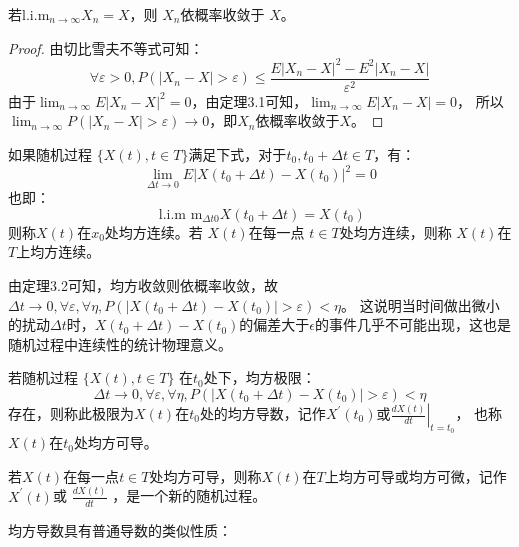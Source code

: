 \begin{theorem}
  若$\mathrm{l.i.m}_{n \rightarrow \infty} X_n=X$，则 $X_n$依概率收敛于 $X$。
\end{theorem}

\begin{proof}
  由切比雪夫不等式可知：
  $$
  \forall \varepsilon>0, P\left(\left|X_n-X\right|>\varepsilon\right) \leq \frac{E\left|X_n-X\right|^2-E^2\left|X_n-X\right|}{\varepsilon^2}
  $$
  由于$\lim _{n \rightarrow \infty} E\left|X_n-X\right|^2=0$，由定理3.1可知，$\lim _{n \rightarrow \infty} E\left|X_n-X\right|=0$，
  所以$\lim _{n \rightarrow \infty} P\left(\left|X_n-X\right|>\varepsilon\right) \rightarrow 0$，即$X_n$依概率收敛于$X$。
\end{proof}

\begin{definition}
  如果随机过程 $\{X(t), t\in T\}$满足下式，对于$t_0, t_0 + \Delta t \in T $，有：
  $$
\lim _{\Delta t \rightarrow 0} E\left|X\left(t_0+\Delta t\right)-X\left(t_0\right)\right|^2=0
$$
也即：
$$
\text { l.i.m } \mathrm{m}_{\Delta t 0} X\left(t_0+\Delta t\right)=X\left(t_0\right)
$$
则称$X(t)$在$x_0$处均方连续。若 $X(t)$在每一点 $t \in T$处均方连续，则称 $X(t)$在$T$上均方连续。
\end{definition}
由定理3.2可知，均方收敛则依概率收敛，故$\Delta t \rightarrow 0, \forall \varepsilon, \forall \eta, P\left(\left|X\left(t_0+\Delta t\right)-X\left(t_0\right)\right|>\varepsilon\right)<\eta$。
这说明当时间做出微小的扰动$\Delta t$时，$X(t_0 + \Delta t) - X(t_0)$的偏差大于$\epsilon$的事件几乎不可能出现，这也是随机过程中连续性的统计物理意义。

\begin{definition}
  若随机过程 $\{ X(t), t \in T \}$ 在$t_0$处下，均方极限：
  \begin{equation}
    \Delta t \rightarrow 0, \forall \varepsilon, \forall \eta, P\left(\left|X\left(t_0+\Delta t\right)-X\left(t_0\right)\right|>\varepsilon\right)<\eta
    \end{equation}
  存在，则称此极限为$X(t)$在$t_0$处的均方导数，记作$X^{\prime}(t_0)$或$\left.\frac{d X(t)}{d t}\right|_{t=t_0}$，
  也称$X(t)$在$t_0$处均方可导。

  若$X(t)$在每一点$t \in T$处均方可导，则称$X(t)$在$T$上均方可导或均方可微，记作$X^{\prime}(t)$或
  $\frac{d X(t)}{d t}$ ，是一个新的随机过程。
\end{definition}

均方导数具有普通导数的类似性质：

